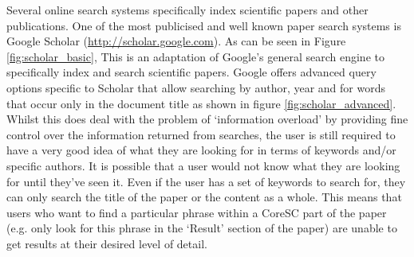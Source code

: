 Several online search systems specifically index scientific papers and other
publications. One of the most publicised and well known paper search systems is
Google Scholar (\url{http://scholar.google.com}).  As can be seen in Figure
\ref{fig:scholar_basic}, This is an adaptation of Google's general search
engine to specifically index and search scientific papers.  Google offers
advanced query options specific to Scholar that allow searching by author, year
and for words that occur only in the document title as shown in figure
\ref{fig:scholar_advanced}. Whilst this does deal with the problem of
`information overload' by providing fine control over the information returned
from searches,  the user is still required to have a very good idea of what
they are looking for in terms of keywords and/or specific authors. It is
possible that a user would not know what they are looking for until they've
seen it. Even if the user has a set of keywords to search for, they can only
search the title of the paper or the content as a whole. This means that users
who want to find a particular phrase within a CoreSC part of the paper (e.g.
only look for this phrase in the `Result' section of the paper) are unable to
get results at their desired level of detail.

